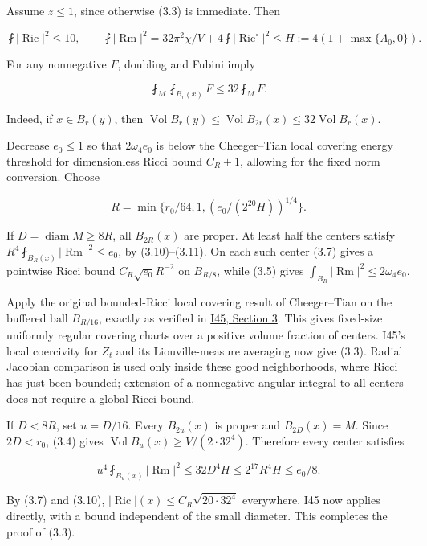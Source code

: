 \documentclass[
  10pt,
]{article}
\begin{document}
Assume \(z\le1\), since otherwise (3.3) is immediate. Then

\[
 \fint|\operatorname{Ric}|^2\le10,\qquad
 \fint|\operatorname{Rm}|^2
       =32\pi^2\chi/V+4\fint|\operatorname{Ric}^{\circ}|^2
       \le H:=4(1+\max\{\Lambda_0,0\}).             \tag{3.10}
\]

For any nonnegative \(F\), doubling and Fubini imply

\[
                     \fint_M\fint_{B_r(x)}F\le32\fint_M F.      \tag{3.11}
\]

Indeed, if \(x\in B_r(y)\), then
\(\operatorname{Vol}B_r(y)\le\operatorname{Vol}B_{2r}(x) \le32\operatorname{Vol}B_r(x)\).

Decrease \(e_0\le1\) so that \(2\omega_4e_0\) is below the Cheeger--Tian
local covering energy threshold for dimensionless Ricci bound \(C_R+1\),
allowing for the fixed norm conversion. Choose

\[
 R=\min\{r_0/64,1,(e_0/(2^{20}H))^{1/4}\}.           \tag{3.12}
\]

If \(D=\operatorname{diam}M\ge8R\), all \(B_{2R}(x)\) are proper. At
least half the centers satisfy
\(R^4\fint_{B_R(x)}|\operatorname{Rm}|^2\le e_0\), by (3.10)--(3.11). On
each such center (3.7) gives a pointwise Ricci bound
\(C_R\sqrt{e_0}R^{-2}\) on \(B_{R/8}\), while (3.5) gives
\(\int_{B_R}|\operatorname{Rm}|^2\le2\omega_4e_0\).

Apply the original bounded-Ricci local covering result of Cheeger--Tian
on the buffered ball \(B_{R/16}\), exactly as verified in
\href{20260927_local_geometry_and_variational_extrema.md}{I45, Section
3}. This gives fixed-size uniformly regular covering charts over a
positive volume fraction of centers. I45's local coercivity for \(Z_t\)
and its Liouville-measure averaging now give (3.3). Radial Jacobian
comparison is used only inside these good neighborhoods, where Ricci has
just been bounded; extension of a nonnegative angular integral to all
centers does not require a global Ricci bound.

If \(D<8R\), set \(u=D/16\). Every \(B_{2u}(x)\) is proper and
\(B_{2D}(x)=M\). Since \(2D<r_0\), (3.4) gives
\(\operatorname{Vol}B_u(x)\ge V/(2\cdot32^4)\). Therefore every center
satisfies

\[
 u^4\fint_{B_u(x)}|\operatorname{Rm}|^2
              \le32D^4H\le2^{17}R^4H\le e_0/8.
\]

By (3.7) and (3.10),
\(|\operatorname{Ric}|(x)\le C_R\sqrt{20\cdot32^4}\) everywhere. I45 now
applies directly, with a bound independent of the small diameter. This
completes the proof of (3.3).
\end{document}
